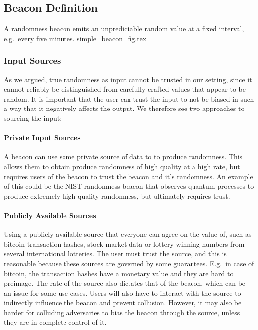 

\subsection{Beacon Definition}

A randomness beacon emits an unpredictable random value at a fixed interval, e.g.\ every five minutes.
{simple_beacon_fig.tex}

\subsubsection{Input Sources}
As we argued, true randomness as input cannot be trusted in our setting, since it cannot reliably be distinguished from carefully crafted values that appear to be random.
It is important that the user can trust the input to not be biased in such a way that it negatively affects the output. We therefore see two approaches to sourcing the input:

\paragraph{Private Input Sources} A beacon can use some private source of data to to produce randomness. This allows them to obtain produce randomness of high quality at a high rate, but requires users of the beacon to trust the beacon and it's randomness. An example of this could be the NIST randomness beacon that observes quantum processes to produce extremely high-quality randomness, but ultimately requires trust.

\paragraph{Publicly Available Sources} Using a publicly available source that everyone can agree on the value of, such as bitcoin transaction hashes, stock market data or lottery winning numbers from several international lotteries.
The user must trust the source, and this is reasonable because these sources are governed by some guarantees. E.g.\ in case of bitcoin, the transaction hashes have a monetary value and they are hard to preimage. The rate of the source also dictates that of the beacon, which can be an issue for some use cases. Users will also have to interact with the source to indirectly influence the beacon and prevent collusion. However, it may also be harder for colluding adversaries to bias the beacon through the source, unless they are in complete control of it.


